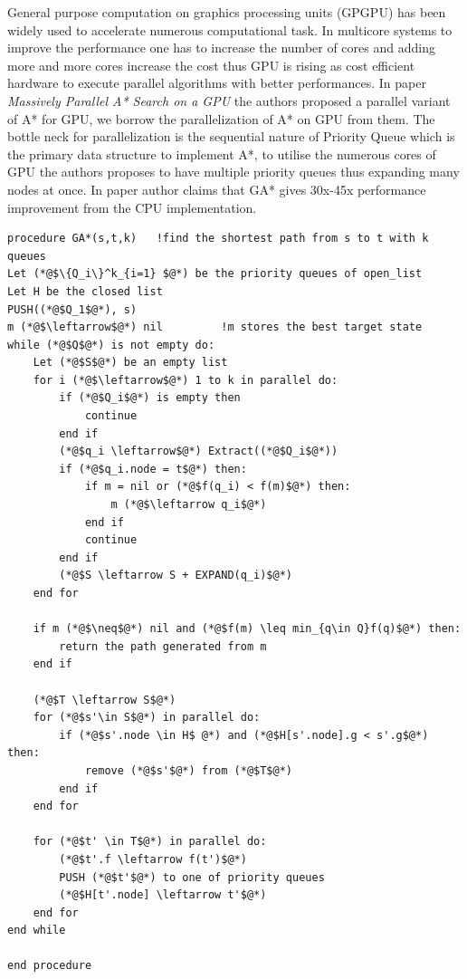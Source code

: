 \documentclass[a4paper]{article}
\begin{document}
General purpose computation on graphics processing units (GPGPU) has been widely used to accelerate numerous computational task. In multicore systems to improve the performance one has to increase the number of cores and adding more and more cores increase the cost thus GPU is rising as cost efficient hardware to execute parallel algorithms with better performances. In paper \textit{Massively Parallel A* Search on a GPU}\cite{GA*} the authors proposed a parallel variant of A* for GPU, we borrow the parallelization of A* on GPU from them. The bottle neck for parallelization is the sequential nature of Priority Queue which is the primary data structure to implement A*, to utilise the numerous cores of GPU the authors proposes to have multiple priority queues thus expanding many nodes at once. In paper author claims that GA* gives 30x-45x performance improvement from the CPU implementation.
\begin{lstlisting}[language=FORTRAN, caption=GA*]
procedure GA*(s,t,k)   !find the shortest path from s to t with k queues
Let (*@$\{Q_i\}^k_{i=1} $@*) be the priority queues of open_list
Let H be the closed list
PUSH((*@$Q_1$@*), s)
m (*@$\leftarrow$@*) nil         !m stores the best target state
while (*@$Q$@*) is not empty do:
    Let (*@$S$@*) be an empty list
    for i (*@$\leftarrow$@*) 1 to k in parallel do:
        if (*@$Q_i$@*) is empty then
            continue
        end if
        (*@$q_i \leftarrow$@*) Extract((*@$Q_i$@*))
        if (*@$q_i.node = t$@*) then:
            if m = nil or (*@$f(q_i) < f(m)$@*) then:
                m (*@$\leftarrow q_i$@*)
            end if
            continue
        end if
        (*@$S \leftarrow S + EXPAND(q_i)$@*)
    end for
    
    if m (*@$\neq$@*) nil and (*@$f(m) \leq min_{q\in Q}f(q)$@*) then:
        return the path generated from m
    end if

    (*@$T \leftarrow S$@*)
    for (*@$s'\in S$@*) in parallel do:
        if (*@$s'.node \in H$ @*) and (*@$H[s'.node].g < s'.g$@*) then:
            remove (*@$s'$@*) from (*@$T$@*)
        end if
    end for
    
    for (*@$t' \in T$@*) in parallel do:
        (*@$t'.f \leftarrow f(t')$@*)
        PUSH (*@$t'$@*) to one of priority queues
        (*@$H[t'.node] \leftarrow t'$@*)
    end for
end while

end procedure
    

\end{lstlisting}
\end{document}
